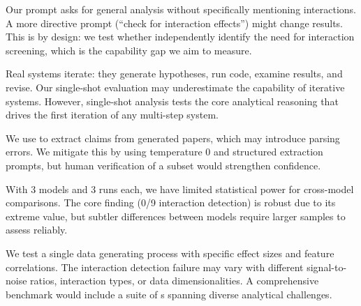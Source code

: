 Our prompt asks for general analysis without specifically mentioning interactions.
A more directive prompt (\eg ``check for interaction effects'') might change results.
This is by design: we test whether \aiscientists independently identify the need for interaction screening, which is the capability gap we aim to measure.

Real \aiscientist systems iterate: they generate hypotheses, run code, examine results, and revise.
Our single-shot evaluation may underestimate the capability of iterative systems.
However, single-shot analysis tests the core analytical reasoning that drives the first iteration of any multi-step system.

We use \gptmodel to extract claims from generated papers, which may introduce parsing errors.
We mitigate this by using temperature 0 and structured extraction prompts, but human verification of a subset would strengthen confidence.

With 3 models and 3 runs each, we have limited statistical power for cross-model comparisons.
The core finding (0/9 interaction detection) is robust due to its extreme value, but subtler differences between models require larger samples to assess reliably.

We test a single data generating process with specific effect sizes and feature correlations.
The interaction detection failure may vary with different signal-to-noise ratios, interaction types, or data dimensionalities.
A comprehensive benchmark would include a suite of \dgp{}s spanning diverse analytical challenges.
